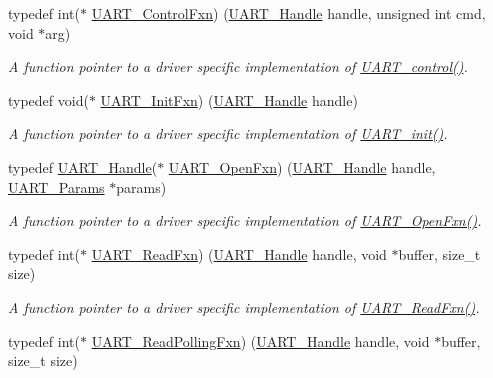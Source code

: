 \begin{DoxyCompactItemize}
typedef int($\ast$ \hyperlink{_u_a_r_t_8h_a4fc98447e6dd805e2d072917e8e6da3b}{U\+A\+R\+T\+\_\+\+Control\+Fxn}) (\hyperlink{_u_a_r_t_8h_a13cc669fae768d8212e6491ce71b28af}{U\+A\+R\+T\+\_\+\+Handle} handle, unsigned int cmd, void $\ast$arg)
\begin{DoxyCompactList}\small\item\em A function pointer to a driver specific implementation of \hyperlink{_u_a_r_t_8h_a9de3c26cfe4ce6b7f350a6ea6e16801d}{U\+A\+R\+T\+\_\+control()}. \end{DoxyCompactList}\item 
typedef void($\ast$ \hyperlink{_u_a_r_t_8h_a2b3e89df3065fffb47e7354067c14d1b}{U\+A\+R\+T\+\_\+\+Init\+Fxn}) (\hyperlink{_u_a_r_t_8h_a13cc669fae768d8212e6491ce71b28af}{U\+A\+R\+T\+\_\+\+Handle} handle)
\begin{DoxyCompactList}\small\item\em A function pointer to a driver specific implementation of \hyperlink{_u_a_r_t_8h_ab60a36f7295d704926120d22f806dcd1}{U\+A\+R\+T\+\_\+init()}. \end{DoxyCompactList}\item 
typedef \hyperlink{_u_a_r_t_8h_a13cc669fae768d8212e6491ce71b28af}{U\+A\+R\+T\+\_\+\+Handle}($\ast$ \hyperlink{_u_a_r_t_8h_a39e21ac60f24eb9ce32286e21de713d1}{U\+A\+R\+T\+\_\+\+Open\+Fxn}) (\hyperlink{_u_a_r_t_8h_a13cc669fae768d8212e6491ce71b28af}{U\+A\+R\+T\+\_\+\+Handle} handle, \hyperlink{struct_u_a_r_t___params}{U\+A\+R\+T\+\_\+\+Params} $\ast$params)
\begin{DoxyCompactList}\small\item\em A function pointer to a driver specific implementation of \hyperlink{_u_a_r_t_8h_a39e21ac60f24eb9ce32286e21de713d1}{U\+A\+R\+T\+\_\+\+Open\+Fxn()}. \end{DoxyCompactList}\item 
typedef int($\ast$ \hyperlink{_u_a_r_t_8h_a4d855b637a26d787afec822d4cd2978e}{U\+A\+R\+T\+\_\+\+Read\+Fxn}) (\hyperlink{_u_a_r_t_8h_a13cc669fae768d8212e6491ce71b28af}{U\+A\+R\+T\+\_\+\+Handle} handle, void $\ast$buffer, size\+\_\+t size)
\begin{DoxyCompactList}\small\item\em A function pointer to a driver specific implementation of \hyperlink{_u_a_r_t_8h_a4d855b637a26d787afec822d4cd2978e}{U\+A\+R\+T\+\_\+\+Read\+Fxn()}. \end{DoxyCompactList}\item 
typedef int($\ast$ \hyperlink{_u_a_r_t_8h_a6b57fb6a7c48272141a727c7de7290e4}{U\+A\+R\+T\+\_\+\+Read\+Polling\+Fxn}) (\hyperlink{_u_a_r_t_8h_a13cc669fae768d8212e6491ce71b28af}{U\+A\+R\+T\+\_\+\+Handle} handle, void $\ast$buffer, size\+\_\+t size)

\end{DoxyCompactItemize}
